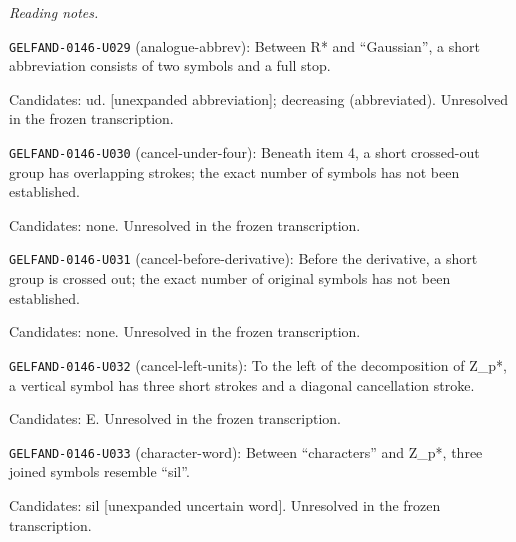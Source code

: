 \par\smallskip\noindent\textit{Reading notes.}\par
\noindent\texttt{GELFAND-0146-U029} (analogue-abbrev): Between R* and “Gaussian”, a short abbreviation consists of two symbols and a full stop.\par
Candidates: ud. [unexpanded abbreviation]; decreasing (abbreviated). Unresolved in the frozen transcription.\par
\noindent\texttt{GELFAND-0146-U030} (cancel-under-four): Beneath item 4, a short crossed-out group has overlapping strokes; the exact number of symbols has not been established.\par
Candidates: none. Unresolved in the frozen transcription.\par
\noindent\texttt{GELFAND-0146-U031} (cancel-before-derivative): Before the derivative, a short group is crossed out; the exact number of original symbols has not been established.\par
Candidates: none. Unresolved in the frozen transcription.\par
\noindent\texttt{GELFAND-0146-U032} (cancel-left-units): To the left of the decomposition of Z\_p*, a vertical symbol has three short strokes and a diagonal cancellation stroke.\par
Candidates: E. Unresolved in the frozen transcription.\par
\noindent\texttt{GELFAND-0146-U033} (character-word): Between “characters” and Z\_p*, three joined symbols resemble “sil”.\par
Candidates: sil [unexpanded uncertain word]. Unresolved in the frozen transcription.\par



